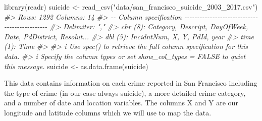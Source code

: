 \documentclass[
]{krantz}
\makeatletter
\newenvironment{Shaded}{\begin{snugshade}}{\end{snugshade}}
\newcommand{\CommentTok}[1]{\textcolor[rgb]{0.37,0.37,0.37}{\textit{#1}}}
\newcommand{\FunctionTok}[1]{\textcolor[rgb]{0,0,0}{#1}}
\newcommand{\NormalTok}[1]{#1}
\newcommand{\OtherTok}[1]{\textcolor[rgb]{0.37,0.37,0.37}{#1}}
\newcommand{\StringTok}[1]{\textcolor[rgb]{0.5,0.5,0.5}{#1}}
\newenvironment{kframe}{%
\medskip{}
\setlength{\fboxsep}{.8em}
 \def\at@end@of@kframe{}%
 \ifinner\ifhmode%
  \def\at@end@of@kframe{\end{minipage}}%
  \begin{minipage}{\columnwidth}%
 \fi\fi%
 \def\FrameCommand##1{\hskip\@totalleftmargin \hskip-\fboxsep
 \colorbox{shadecolor}{##1}\hskip-\fboxsep
     \hskip-\linewidth \hskip-\@totalleftmargin \hskip\columnwidth}%
 \MakeFramed {\advance\hsize-\width
   \@totalleftmargin\z@ \linewidth\hsize
   \@setminipage}}%
 {\par\unskip\endMakeFramed%
 \at@end@of@kframe}
\renewenvironment{Shaded}{\begin{kframe}}{\end{kframe}}
\makeatother
\begin{document}
\begin{Shaded}
\begin{Highlighting}[]
\FunctionTok{library}\NormalTok{(readr)}
\NormalTok{suicide }\OtherTok{\textless{}{-}} \FunctionTok{read\_csv}\NormalTok{(}\StringTok{"data/san\_francisco\_suicide\_2003\_2017.csv"}\NormalTok{)}
\CommentTok{\#\textgreater{} Rows: 1292 Columns: 14}
\CommentTok{\#\textgreater{} {-}{-} Column specification {-}{-}{-}{-}{-}{-}{-}{-}{-}{-}{-}{-}{-}{-}{-}{-}{-}{-}{-}{-}{-}{-}{-}{-}{-}{-}{-}{-}{-}{-}{-}{-}{-}{-}{-}{-}{-}{-}{-}{-}{-}{-}{-}{-}{-}{-}}
\CommentTok{\#\textgreater{} Delimiter: ","}
\CommentTok{\#\textgreater{} chr  (8): Category, Descript, DayOfWeek, Date, PdDistrict, Resolut...}
\CommentTok{\#\textgreater{} dbl  (5): IncidntNum, X, Y, PdId, year}
\CommentTok{\#\textgreater{} time (1): Time}
\CommentTok{\#\textgreater{} }
\CommentTok{\#\textgreater{} i Use \textasciigrave{}spec()\textasciigrave{} to retrieve the full column specification for this data.}
\CommentTok{\#\textgreater{} i Specify the column types or set \textasciigrave{}show\_col\_types = FALSE\textasciigrave{} to quiet this message.}
\NormalTok{suicide }\OtherTok{\textless{}{-}} \FunctionTok{as.data.frame}\NormalTok{(suicide)}
\end{Highlighting}
\end{Shaded}

This data contains information on each crime reported in San Francisco including the type of crime (in our case always suicide), a more detailed crime category, and a number of date and location variables. The columns X and Y are our longitude and latitude columns which we will use to map the data.
\end{document}
